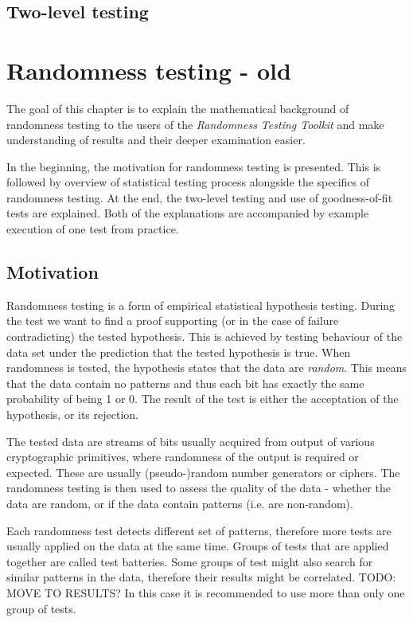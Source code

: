 \documentclass[
  digital,     %
  oneside,     %
  nosansbold,  %
  nocolorbold, %
  nolof,         %
  nolot,         %
]{fithesis4}
\begin{document}
\section{Two-level testing}



\chapter{Randomness testing - old}

The goal of this chapter is to explain the mathematical background of randomness testing to the users of the \emph{Randomness Testing Toolkit} and make understanding of results and their deeper examination easier.

In the beginning, the motivation for randomness testing is presented. This is followed by overview of statistical testing process alongside the specifics of randomness testing. At the end, the two-level testing and use of goodness-of-fit tests are explained. Both of the explanations are accompanied by example execution of one test from practice. 

\section{Motivation}

Randomness testing is a form of empirical statistical hypothesis testing. During the test we want to find a proof supporting (or in the case of failure contradicting) the tested hypothesis. This is achieved by testing behaviour of the data set under the prediction that the tested hypothesis is true. When randomness is tested, the hypothesis states that the data are \emph{random}. This means that the data contain no patterns and thus each bit has exactly the same probability of being 1 or 0. The result of the test is either the acceptation of the hypothesis, or its rejection.

The tested data are streams of bits usually acquired from output of various cryptographic primitives, where randomness of the output is required or expected. These are usually (pseudo-)random number generators or ciphers. The randomness testing is then used to assess the quality of the data - whether the data are random, or if the data contain patterns (i.e. are non-random).

Each randomness test detects different set of patterns, therefore more tests are usually applied on the data at the same time. Groups of tests that are applied together are called test batteries. Some groups of test might also search for similar patterns in the data, therefore their results might be correlated. \cite[p. 2]{bad_day} TODO: MOVE TO RESULTS? In this case it is recommended to use more than only one group of tests.
\end{document}
